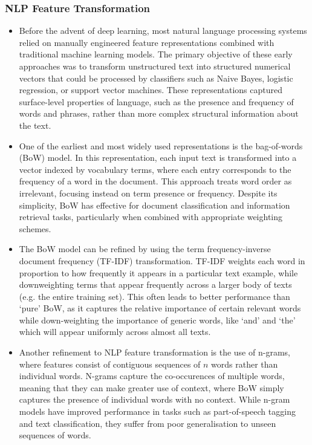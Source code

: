 \documentclass{report}
\begin{document}
\subsubsection{NLP Feature Transformation}

\begin{itemize}
\item Before the advent of deep learning, most natural language processing systems relied on manually engineered feature representations combined with traditional machine learning models\cite{manning1999foundations}. The primary objective of these early approaches was to transform unstructured text into structured numerical vectors that could be processed by classifiers such as Naive Bayes, logistic regression, or support vector machines. These representations captured surface-level properties of language, such as the presence and frequency of words and phrases, rather than more complex structural information about the text.

\item One of the earliest and most widely used representations is the bag-of-words (BoW) model\cite{manning1999foundations}. In this representation, each input text is transformed into a vector indexed by vocabulary terms, where each entry corresponds to the frequency of a word in the document. This approach treats word order as irrelevant, focusing instead on term presence or frequency. Despite its simplicity, BoW has effective for document classification and information retrieval tasks, particularly when combined with appropriate weighting schemes.

\item The BoW model can be refined by using the term frequency-inverse document frequency (TF-IDF) transformation. TF-IDF weights each word in proportion to how frequently it appears in a particular text example, while downweighting terms that appear frequently across a larger body of texts (e.g. the entire training set)\cite{manning1999foundations}. This often leads to better performance than `pure' BoW, as it captures the relative importance of certain relevant words while down-weighting the importance of generic words, like `and' and `the' which will appear uniformly across almost all texts.

\item Another refinement to NLP feature transformation is the use of n-grams, where features consist of contiguous sequences of $n$ words rather than individual words\cite{jm-2025-nlp}. N-grams capture the co-occurences of multiple words, meaning that they can make greater use of context, where BoW simply captures the presence of individual words with no context. While n-gram models have improved performance in tasks such as part-of-speech tagging and text classification, they suffer from poor generalisation to unseen sequences of words\cite{bengio2003neural}.
\end{itemize}
\end{document}
